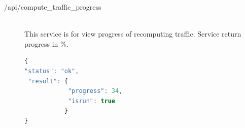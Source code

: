 \begin{description}
  \item[/api/compute\_traffic\_progress] \hfill \\ 
    This service is for view progress of recomputing traffic. Service return progress in \%.\\
    \begin{lstlisting}[language=javascript]
{
"status": "ok",
 "result": {
 			"progress": 34,
 			"isrun": true
 		   }
}
    \end{lstlisting}
  
\end{description}




